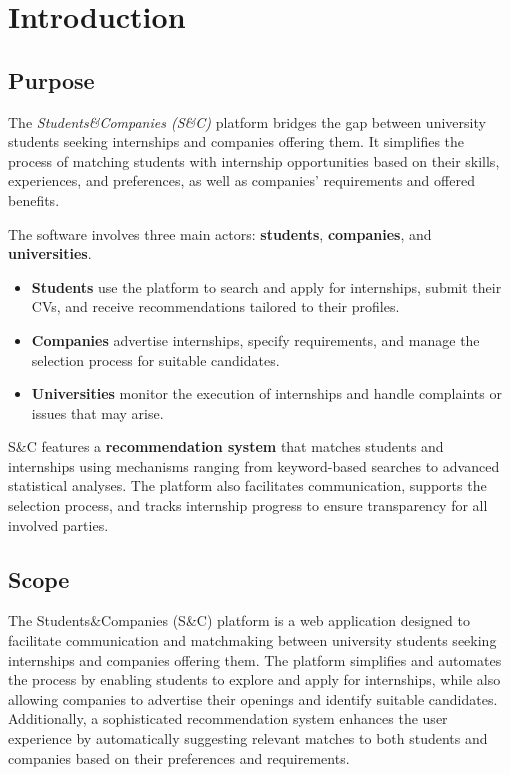 \chapter{Introduction}

\section{Purpose}


The \textit{Students\&Companies (S\&C)} platform bridges the gap between university students seeking
internships and companies offering them. It simplifies the process of matching students with internship
opportunities based on their skills, experiences, and preferences, as well as companies' requirements
and offered benefits.

The software involves three main actors: \textbf{students}, \textbf{companies}, and \textbf{universities}.

\begin{itemize}
    \item \textbf{Students} use the platform to search and apply for internships, submit their CVs, and
    receive recommendations tailored to their profiles.
    \item \textbf{Companies} advertise internships, specify requirements, and manage the selection
    process for suitable candidates.
    \item \textbf{Universities} monitor the execution of internships and handle complaints or
    issues that may arise.
\end{itemize}

S\&C features a \textbf{recommendation system} that matches students and internships using mechanisms
ranging from keyword-based searches to advanced statistical analyses. The platform also facilitates
communication, supports the selection process, and tracks internship progress to ensure transparency
for all involved parties.

\newpage
\section{Scope}

The Students\&Companies (S\&C) platform is a web application designed to facilitate communication and
matchmaking between university students seeking internships and companies offering them. The platform
simplifies and automates the process by enabling students to explore and apply for internships, while
also allowing companies to advertise their openings and identify suitable candidates. Additionally,
a sophisticated recommendation system enhances the user experience by automatically suggesting relevant
matches to both students and companies based on their preferences and requirements.


